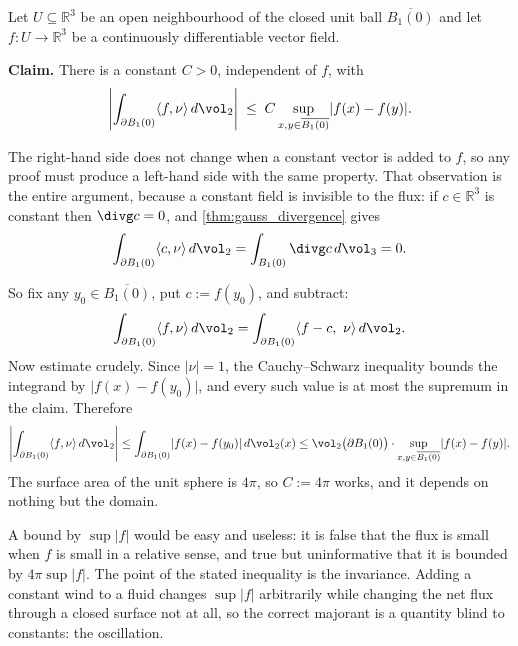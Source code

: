 \begin{example}
\label{ex:flux_bounded_by_oscillation}
Let $U \subseteq \mathbb{R}^3$ be an open neighbourhood of the closed unit ball
$\overline{B_1(0)}$ and let $f : U \to \mathbb{R}^3$ be a continuously differentiable vector field.

\textbf{Claim.} There is a constant $C > 0$, independent of $f$, with
\[\left\lvert \int_{\partial B_1(0)} \langle f,\nu\rangle \,d\vol_2 \right\rvert
  \;\le\; C \sup_{x,y \in \overline{B_1(0)}} \lvert f(x)-f(y)\rvert .\]

The right-hand side does not change when a constant vector is added to $f$, so any proof must
produce a left-hand side with the same property. That observation is the entire argument, because
a constant field is invisible to the flux: if $c \in \mathbb{R}^3$ is constant then
$\divg c = 0$, and \cref{thm:gauss_divergence} gives
\[\int_{\partial B_1(0)} \langle c,\nu\rangle\,d\vol_2 = \int_{B_1(0)} \divg c \, d\vol_3 = 0.\]

So fix any $y_0 \in \overline{B_1(0)}$, put $c := f(y_0)$, and subtract:
\[\int_{\partial B_1(0)} \langle f,\nu\rangle \,d\vol_2
 = \int_{\partial B_1(0)} \langle f - c,\ \nu\rangle \,d\vol_2 .\]
Now estimate crudely. Since $\lvert\nu\rvert = 1$, the Cauchy--Schwarz inequality bounds the
integrand by $\lvert f(x) - f(y_0)\rvert$, and every such value is at most the supremum in the
claim. Therefore
\[\left\lvert \int_{\partial B_1(0)} \langle f,\nu\rangle \,d\vol_2 \right\rvert
 \le \int_{\partial B_1(0)} \lvert f(x)-f(y_0)\rvert \,d\vol_2(x)
 \le \vol_2\big(\partial B_1(0)\big) \cdot \sup_{x,y\in\overline{B_1(0)}}\lvert f(x)-f(y)\rvert .\]
The surface area of the unit sphere is $4\pi$, so $C := 4\pi$ works, and it depends on nothing but
the domain.

\begin{remark}
A bound by $\sup\lvert f\rvert$ would be easy and useless: it is false that the flux is small when
$f$ is small in a relative sense, and true but uninformative that it is bounded by $4\pi\sup\lvert
f\rvert$. The point of the stated inequality is the invariance. Adding a constant wind to a fluid
changes $\sup\lvert f\rvert$ arbitrarily while changing the net flux through a closed surface not
at all, so the correct majorant is a quantity blind to constants: the oscillation.


\end{remark}
\end{example}
